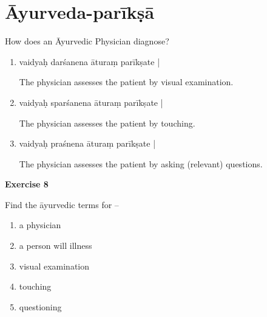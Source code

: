 \chapter{Āyurveda-parīkṣā}

\begin{center}
How does an Āyurvedic Physician diagnose?
\end{center}

\begin{enumerate}
\item {}

vaidyaḥ darśanena āturaṃ parīkṣate |

The physician assesses the patient by visual examination. 

\item {}

vaidyaḥ sparśanena āturaṃ parīkṣate | 

The physician assesses  the patient by touching. 

\item {}

vaidyaḥ praśnena āturaṃ parīkṣate | 

The physician assesses the patient by asking (relevant) questions.
\end{enumerate}

\begin{center}
\textbf{\large Exercise 8}
\end{center}

Find the āyurvedic terms for –
\begin{enumerate}
\renewcommand{\theenumi}{\alph{enumi}}
\renewcommand{\labelenumi}{\theenumi.}
\item a physician
\item a person will illness
\item visual examination
\item touching
\item questioning
\end{enumerate}
